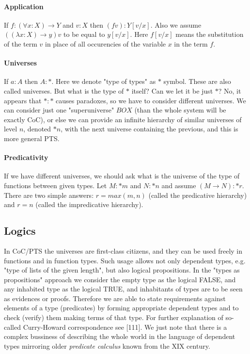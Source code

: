 \documentclass[11pt,oneside]{article}
\begin{document}
\paragraph{Application}
If $f : (\forall x : X)\rightarrow Y$ and $v : X$  then $(f v) : Y[v/x]$.
Also we assume $((\lambda x : X)\rightarrow y) v$
to be equal to $y[v/x]$.
Here $f[v/x]$ means the substitution of the term $v$ in place of all
occurencies of the variable $x$ in the term $f$.

\paragraph{Universes}
If $a : A$ then $A : *$.
Here we denote "type of types" as $*$ symbol.
These are also called universes.
But what is the type of $*$ itself? Can we let it be just $*$?
No, it appears that $* : *$ causes paradoxes, so
we have to consider different universes.
We can consider just one "superuniverse" $BOX$
(than the whole system will be exactly CoC),
or else we can provide an infinite hierarchy of similar universes
of level $n$, denoted $*{n}$,
with the next universe containing the previous,
and this is more general PTS.

\paragraph{Predicativity}
If we have different universes, we should ask what is the universe
of the type of functions between given types.
Let $M : *{m}$ and $N : *{n}$ and assume $(M \rightarrow N) : *{r} $.
There are two simple answers:
$r = max (m, n)$ (called the predicative hierarchy) and
$r = n$ (called the impredicative hierarchy).

\subsection{Logics}
In CoC/PTS the universes are first-class citizens,
and they can be used freely in functions and in function types.
Such usage allows not only dependent types, e.g. "type of lists of the
given length", but also logical propositions.
In the "types as propositions" approach we consider the empty type
as the logical FALSE, and any inhabited type as the logical TRUE,
and inhabitants of types are to be seen as evidences or proofs.
Therefore we are able to state requirements against elements of a type
(predicates) by forming appropriate dependent types
and to check (verify) them making terms of that type.
For further explanation of so-called Curry-Howard correspondence
see [111].
We just note that there is a complex bussiness of
describing the whole world in the language of dependent types
mirroring older {\em predicate calculus} known from the XIX century.
\end{document}
